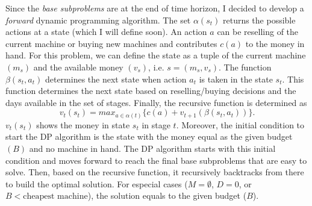 \documentclass{article}
\begin{document}
Since the \emph{base subproblems} are at the end of time horizon, I decided to develop a \emph{forward} dynamic programming algorithm.
The set $\alpha(s_t)$ returns the possible actions at a state (which I will define soon). An action $a$ can be reselling of the current machine or buying new machines and contributes $c(a)$ to the money in hand.
For this problem, we can define the state as a tuple of the current machine $(m_s)$ and the available money $(v_s)$, i.e. $s = (m_s, v_s)$.
The function $\beta(s_t, a_t)$ determines the next state when action $a_t$ is taken in the state $s_t$.
This function determines the next state based on reselling/buying decisions and the days available in the set of stages.
Finally, the recursive function is determined as
$$v_t(s_t) = max_{a \in \alpha(t)}\{c(a) + v_{t+1}(\beta(s_t,a_t))\}.$$
$v_t(s_t)$ shows the money in state $s_t$ in stage $t$. 
Moreover, the initial condition to start the DP algorithm is the state with the money equal as the given budget $(B)$ and no machine in hand. 
The DP algorithm starts with this initial condition and moves forward to reach the final base subproblems that are easy to solve. Then, based on the recursive function, it recursively backtracks from there to build the optimal solution. For especial cases ($M=\emptyset$, $D=0$, or $B < \text{cheapest machine}$), the solution equals to the given budget ($B$).
\end{document}
